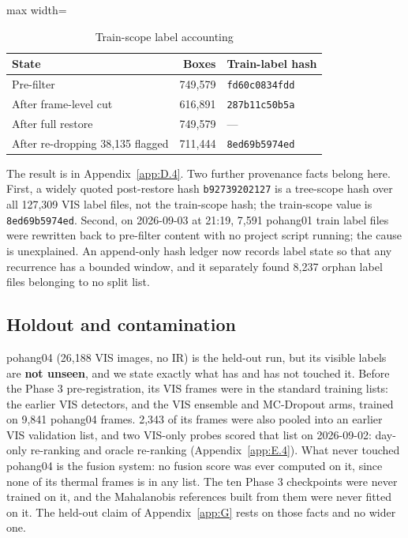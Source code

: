 \documentclass[journal,onecolumn]{IEEEtran}
\begin{document}
\begin{table}[htbp]
\centering
\small
\caption{Train-scope label accounting}
\label{tab:5}
\begin{adjustbox}{max width=\linewidth}
\begin{tabular}{lrl}
\toprule
State & Boxes & Train-label hash \\
\midrule
Pre-filter & 749,579 & \texttt{fd60c0834fdd} \\
After frame-level cut & 616,891 & \texttt{287b11c50b5a} \\
After full restore & 749,579 & --- \\
After re-dropping 38,135 flagged & 711,444 & \texttt{8ed69b5974ed} \\
\bottomrule
\end{tabular}
\end{adjustbox}
\end{table}
The result is in Appendix~\ref{app:D.4}. Two further provenance facts belong here. First, a widely quoted post-restore hash \texttt{b92739202127} is a tree-scope hash over all 127,309 VIS label files, not the train-scope hash; the train-scope value is \texttt{8ed69b5974ed}. Second, on 2026-09-03 at 21:19, 7,591 pohang01 train label files were rewritten back to pre-filter content with no project script running; the cause is unexplained. An append-only hash ledger now records label state so that any recurrence has a bounded window, and it separately found 8,237 orphan label files belonging to no split list.

\subsection{Holdout and contamination}\label{app:A.5}
pohang04 (26,188 VIS images, no IR) is the held-out run, but its visible labels are \textbf{not unseen}, and we state exactly what has and has not touched it. Before the Phase 3 pre-registration, its VIS frames were in the standard training lists: the earlier VIS detectors, and the VIS ensemble and MC-Dropout arms, trained on 9,841 pohang04 frames. 2,343 of its frames were also pooled into an earlier VIS validation list, and two VIS-only probes scored that list on 2026-09-02: day-only re-ranking and oracle re-ranking (Appendix~\ref{app:E.4}). What never touched pohang04 is the fusion system: no fusion score was ever computed on it, since none of its thermal frames is in any list. The ten Phase 3 checkpoints were never trained on it, and the Mahalanobis references built from them were never fitted on it. The held-out claim of Appendix~\ref{app:G} rests on those facts and no wider one.
\end{document}
